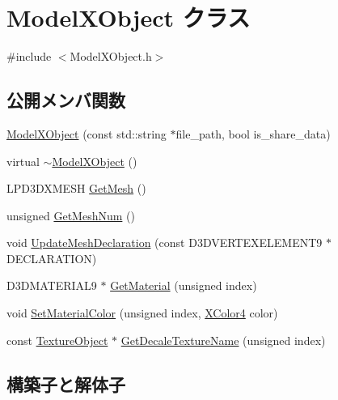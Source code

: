 \hypertarget{class_model_x_object}{}\section{Model\+X\+Object クラス}
\label{class_model_x_object}


{\ttfamily \#include $<$Model\+X\+Object.\+h$>$}

\subsection*{公開メンバ関数}
\begin{DoxyCompactItemize}
\item 
\mbox{\hyperlink{class_model_x_object_a83bd334b1f24a69c4cbdcaa62464ff31}{Model\+X\+Object}} (const std\+::string $\ast$file\+\_\+path, bool is\+\_\+share\+\_\+data)
\item 
virtual \mbox{\hyperlink{class_model_x_object_a33553f8ab78dfd3c9d571a048ae85324}{$\sim$\+Model\+X\+Object}} ()
\item 
L\+P\+D3\+D\+X\+M\+E\+SH \mbox{\hyperlink{class_model_x_object_a3aaab083fe6e1956b2eaab815ebb4bfb}{Get\+Mesh}} ()
\item 
unsigned \mbox{\hyperlink{class_model_x_object_a8e91c6bda6b00055bae0707037d81d9f}{Get\+Mesh\+Num}} ()
\item 
void \mbox{\hyperlink{class_model_x_object_ac005f3f164a1f75d6cfc0772e2e95382}{Update\+Mesh\+Declaration}} (const D3\+D\+V\+E\+R\+T\+E\+X\+E\+L\+E\+M\+E\+N\+T9 $\ast$D\+E\+C\+L\+A\+R\+A\+T\+I\+ON)
\item 
D3\+D\+M\+A\+T\+E\+R\+I\+A\+L9 $\ast$ \mbox{\hyperlink{class_model_x_object_a27df4304e87da11e2f9c9d7a8487a985}{Get\+Material}} (unsigned index)
\item 
void \mbox{\hyperlink{class_model_x_object_acc6b5f187b74b421451c8c2c7c2964d7}{Set\+Material\+Color}} (unsigned index, \mbox{\hyperlink{_vector3_d_8h_a680c30c4a07d86fe763c7e01169cd6cc}{X\+Color4}} color)
\item 
const \mbox{\hyperlink{class_texture_object}{Texture\+Object}} $\ast$ \mbox{\hyperlink{class_model_x_object_afd57d5b6b74817f4d69047640e69f14e}{Get\+Decale\+Texture\+Name}} (unsigned index)
\end{DoxyCompactItemize}


\subsection{構築子と解体子}
\mbox{\label{class_model_x_object_a83bd334b1f24a69c4cbdcaa62464ff31}} 
